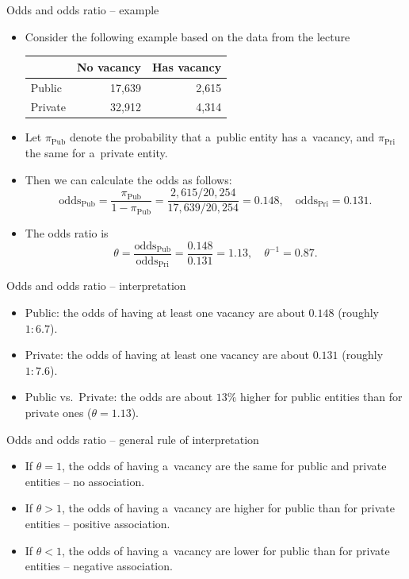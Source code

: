 \documentclass[10pt,ignorenonframetext,aspectratio=169]{beamer}
\begin{document}
\begin{frame}{Odds and odds ratio -- example}
    \begin{itemize}
        \item Consider the following example based on the data from the lecture
        \begin{table}
            \centering
            \begin{tabular}{lrr}
            \hline
                      & No vacancy & Has vacancy \\
            \hline
            Public    & 17{,}639   & 2{,}615     \\
            Private   & 32{,}912   & 4{,}314     \\
            \hline
            \end{tabular}
        \end{table}
    \item Let $\pi_{\text{Pub}}$ denote the probability that a~public entity has a~vacancy, and $\pi_{\text{Pri}}$ the same for a~private entity.
    \item Then we can calculate the odds as follows:
    $$
    \text{odds}_{\text{Pub}} = \frac{\pi_{\text{Pub}}}{1 - \pi_{\text{Pub}}} = \frac{2{,}615/20{,}254}{17{,}639/20{,}254} = 0.148, \quad \text{odds}_{\text{Pri}} = 0.131.
    $$
    \item The odds ratio is
    $$
    \theta = \frac{\text{odds}_{\text{Pub}}}{\text{odds}_{\text{Pri}}} = \frac{0.148}{0.131} = 1.13, \quad \theta^{-1} = 0.87.
    $$
    \end{itemize}
\end{frame}

\begin{frame}{Odds and odds ratio -- interpretation}
    \begin{itemize}
        \item Public: the odds of having at least one vacancy are about $0.148$ (roughly $1{:}6.7$).
        \item Private: the odds of having at least one vacancy are about $0.131$ (roughly $1{:}7.6$).
        \item Public vs.\ Private: the odds are about $13\%$ higher for public entities than for private ones ($\theta = 1.13$).
    \end{itemize}
\end{frame}

\begin{frame}{Odds and odds ratio -- general rule of interpretation}
    \begin{itemize}
        \item If $\theta = 1$, the odds of having a~vacancy are the same for public and private entities -- no association.
        \item If $\theta > 1$, the odds of having a~vacancy are higher for public than for private entities -- positive association.
        \item If $\theta < 1$, the odds of having a~vacancy are lower for public than for private entities -- negative association.
    \end{itemize}
\end{frame}
\end{document}
